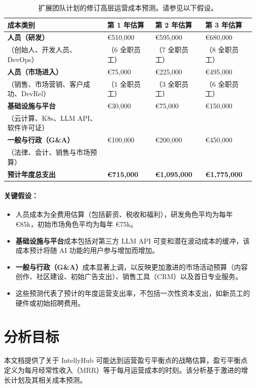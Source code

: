 \documentclass[11pt, a4paper, oneside]{article}
\begin{document}
\newpage
\begin{table}[H]
\centering
\begin{tabularx}{\textwidth}{L L L L}
\toprule
\textbf{成本类别} & \textbf{第 1 年估算} & \textbf{第 2 年估算} & \textbf{第 3 年估算} \\
\midrule
\textbf{人员（研发）} & €510,000 & €595,000 & €680,000 \\
（创始人、开发人员、DevOps） & （6 全职员工） & （7 全职员工） & （8 全职员工） \\
\addlinespace
\textbf{人员（市场进入）} & €75,000 & €225,000 & €495,000 \\
（销售、市场营销、客户成功、DevRel） & （1 全职员工） & （3 全职员工） & （6 全职员工） \\
\addlinespace
\textbf{基础设施与平台} & €30,000 & €75,000 & €150,000 \\
（云计算、K8s、LLM API、软件许可证） & & & \\
\addlinespace
\textbf{一般与行政（G\&A）} & €100,000 & €200,000 & €450,000 \\
（法律、会计、销售与市场预算） & & & \\
\midrule
\textbf{预计年度总支出} & \textbf{€715,000} & \textbf{€1,095,000} & \textbf{€1,775,000} \\
\bottomrule
\end{tabularx}
\caption{扩展团队计划的修订高层运营成本预测。请参见以下假设。}
\label{tab:cost_projections_expanded_team}
\end{table}

\paragraph*{关键假设：}
\begin{itemize}
    \item 人员成本为全费用估算（包括薪资、税收和福利），研发角色平均为每年 €85k，初始市场角色平均为每年 €75k。
    \item \textbf{基础设施与平台}成本包括对第三方 LLM API 可变和潜在波动成本的缓冲，该成本预计将随 AI 功能的用户参与增加而增加。
    \item \textbf{一般与行政（G\&A）}成本显著上调，以反映更加激进的市场活动预算（内容创作、社区建设、初始广告支出）、销售工具（CRM）以及首日专业服务。
    \item 这些预测代表了预计的年度运营支出率，不包括一次性资本支出，如新员工的硬件或初始招聘费用。
\end{itemize}

\section{分析目标}
本文档提供了关于 IntellyHub 可能达到运营盈亏平衡点的战略估算，盈亏平衡点定义为每月经常性收入（MRR）等于每月运营成本的时刻。该分析基于激进的增长计划及其相关成本预测。
\end{document}
